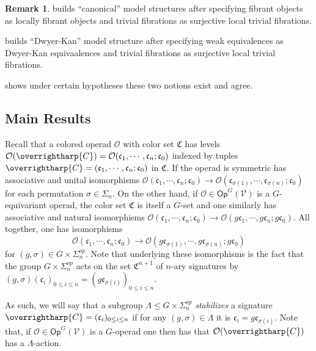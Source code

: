 \documentclass[a4paper,10pt
,draft
]{article}%
\numberwithin{equation}{section}
\numberwithin{figure}{section}
\theoremstyle{definition} %
\newtheorem{remark}[equation]{Remark}%
\newcommand{\vect}[1]{\text{\overrightharp{\ensuremath{#1}}}}
\newcommand{\V}{\ensuremath{\mathcal V}}
\renewcommand{\O}{\ensuremath{\mathcal O}}
\newcommand{\1}{\ensuremath{\mathbbm 1}}%
\begin{document}
  \begin{remark}
        \cite{BM13a} builds ``canonical'' model structures after specifying
        fibrant objects as locally fibrant objects and
        trivial fibrations as surjective local trivial fibrations.
        
        \cite{Mur15} builds ``Dwyer-Kan'' model structure after specifying
        weak equivalences as Dwyer-Kan equivaalences and
        trivial fibrations as surjective local trivial fibrations.
        
        \cite{Sta14} shows under certain hypotheses these two notions exist and agree.
\end{remark}





\subsection{Main Results}


Recall that a colored operad $\O$
with color set $\mathfrak{C}$ has levels 
$
\O(\vect{C})=
\O(\mathfrak{c}_1,\cdots,\mathfrak{c}_n;\mathfrak{c}_0)$
indexed by tuples 
$\vect{C} = (\mathfrak{c}_1,\cdots,\mathfrak{c}_n;\mathfrak{c}_0)$
in $\mathfrak{C}$.
If the operad is symmetric has associative and unital isomorphisms
$
\O(\mathfrak{c}_1,\cdots,\mathfrak{c}_n;\mathfrak{c}_0) \to 
\O(\mathfrak{c}_{\sigma(1)},\cdots,\mathfrak{c}_{\sigma(n)};\mathfrak{c}_0)
$
for each permutation $\sigma \in \Sigma_n$.
On the other hand, if 
$\O \in \mathsf{Op}^G(\V)$
is a $G$-equivariant operad, 
the color set $\mathfrak{C}$ is itself a $G$-set
and one similarly has associative and natural isomorphisms
$
\O(\mathfrak{c}_1,\cdots,\mathfrak{c}_n;\mathfrak{c}_0) \to 
\O(g\mathfrak{c}_{1},\cdots,g\mathfrak{c}_{n};g\mathfrak{c}_0)
$.
All together, one has isomorphisms
\[
\O(\mathfrak{c}_1,\cdots,\mathfrak{c}_n;\mathfrak{c}_0)
\to 
\O(g \mathfrak{c}_{\sigma(1)},\cdots,g \mathfrak{c}_{\sigma(n)};g\mathfrak{c}_0)
\]
for $(g,\sigma) \in G \times \Sigma_n^{op}$.
Note that underlying these isomorphisms is the fact that
the group
$G \times \Sigma_n^{op}$
acts on the set $\mathfrak{C}^{n+1}$ of $n$-ary signatures by 
$(g,\sigma) (\mathfrak{c}_i)_{0\leq i \leq n}
= (g \mathfrak{c}_{\sigma(i)})_{0\leq i \leq n}$.

As such, we will say that a subgroup 
$\Lambda \leq G \times \Sigma_n^{op}$
\emph{stabilizes} a signature $\vect{C}=(\mathfrak{c}_i)_{0 \leq i \leq n}$
if for any 
$(g,\sigma) \in \Lambda$ it is 
$\mathfrak{c}_i = g \mathfrak{c}_{\sigma(i)}$.
Note that, if $\O \in \mathsf{Op}^G(\V)$
is a $G$-operad one then has that
$\O(\vect{C})$ has a $\Lambda$-action.
\end{document}
